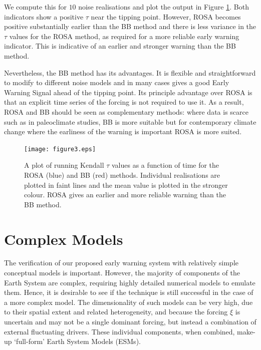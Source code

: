 We compute this for $10$ noise realisations and plot the output 
in Figure \cref{fig:boers_method}. Both indicators show a positive 
$\tau$ near the tipping point. However, ROSA becomes positive substantially earlier than the BB method and there is less variance in the $\tau$ values for the ROSA method, as required for a more reliable early warning indicator. This is indicative of an earlier and stronger warning than the BB method. 

Nevertheless, the BB method has its advantages.
It is flexible and straightforward to modify to different noise
models and in many cases gives a good Early Warning Signal 
ahead of the tipping point. Its principle advantage
over ROSA is that an explicit time series of the forcing is not required to use it. As a result, ROSA and BB should be seen as complementary methods: 
where data is scarce such as in paleoclimate studies, BB is more suitable but 
for contemporary climate change where the earliness of the warning is 
important ROSA is more suited.

\begin{figure}
\texttt{[image: figure3.eps]}
\caption{A plot of running Kendall $\tau$ values as a function of time for the ROSA (blue) and BB (red) methods. Individual realisations are plotted in faint lines and the mean value is plotted in the stronger colour. ROSA gives an earlier and more reliable warning than the BB 
method.}
\label{fig:boers_method}
\end{figure}

\section{Complex Models}
The verification of our proposed early warning system with relatively simple conceptual models is important.
However, the majority of components of the Earth System are complex, requiring highly detailed numerical models to emulate them. Hence, it is 
desirable to see if the technique is still successful in the case of
a more complex model. The dimensionality of such models can be very high, due to their spatial extent and related heterogeneity, and 
because the forcing $\xi$ is uncertain and may not be a single dominant forcing,  but instead a combination of external fluctuating drivers. These individual components, when combined, make-up `full-form' Earth System Models (ESMs).

